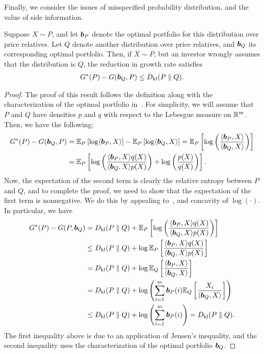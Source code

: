     Finally, we consider the issues of misspecified probability distribution, and the value of side information. 
    \begin{proposition}
        \label{prop:misspecified-distribution-portfolio}
         Suppose $X \sim P$, and let $\boldsymbol{b}_P$ denote the  optimal portfolio for this distribution over price relatives. Let $Q$ denote another distribution over price relatives, and $\boldsymbol{b}_Q$ its corresponding optimal portfolio. Then, if $X\sim P$, but an investor wrongly assumes that the distribution is $Q$, the reduction in growth rate satisfies 
        \begin{align}
            G^*(P) - G(\boldsymbol{b}_Q, P) \leq D_{\text{kl}}(P \parallel Q). 
        \end{align}
    \end{proposition} 
    \begin{proof}
        The proof of this result follows the definition along with the characterization of the optimal portfolio in~.  For simplicity, we will assume that $P$ and $Q$  have densities $p$ and $q$ with respect to the Lebesgue measure on $\mathbb{R}^m$. Then, we have the following: 
        \begin{align}
            G^*(P) - G(\boldsymbol{b}_Q, P) &= \mathbb{E}_P\left[ \log \langle \boldsymbol{b}_P, X \rangle \right]  - \mathbb{E}_P\left[ \log \langle \boldsymbol{b}_Q, X \rangle \right]  
             = \mathbb{E}_P\left[ \log  \left( \frac{\langle \boldsymbol{b}_P, X \rangle}{\langle \boldsymbol{b}_Q, X \rangle} \right)  \right]\\
             & = \mathbb{E}_P \left[ \log  \left( \frac{\langle \boldsymbol{b}_P, X \rangle  q(X)}{\langle \boldsymbol{b}_Q, X \rangle  p(X)} \right)  + \log \left( \frac{p(X)}{q(X)}\right) \right]. 
        \end{align}
        Now, the expectation of the second term is clearly the relative entropy between $P$ and $Q$, and to complete the proof, we need to show that the expectation of the first term is nonnegative. We do this by appealing to~, and concavity of $\log(\cdot)$. In particular, we have 
        \begin{align}
            G^*(P) - G(P, \boldsymbol{b}_Q) &= D_{\text{kl}}(P \parallel Q) + \mathbb{E}_P \left[ \log  \left( \frac{\langle \boldsymbol{b}_P, X \rangle  q(X)}{\langle \boldsymbol{b}_Q, X \rangle  p(X)} \right) \right]  \\
            & \leq D_{\text{kl}}(P \parallel Q) + \log   \mathbb{E}_P \left[ \frac{\langle \boldsymbol{b}_P, X \rangle  q(X)}{\langle \boldsymbol{b}_Q, X \rangle  p(X)}  \right]   \\
            & = D_{\text{kl}}(P \parallel Q) + \log   \mathbb{E}_Q \left[ \frac{\langle \boldsymbol{b}_P, X \rangle }{\langle \boldsymbol{b}_Q, X \rangle}  \right]   \\
            & = D_{\text{kl}}(P \parallel Q) + \log \left( \sum_{i=1}^m \boldsymbol{b}_P(i) \mathbb{E}_Q\left[ \frac{X_i}{\langle \boldsymbol{b}_Q, X\rangle} \right] \right) \\
            & \leq D_{\text{kl}}(P \parallel Q)  + \log \left( \sum_{i=1}^m \boldsymbol{b}_P(i)  \right) = D_{\text{kl}}(P \parallel Q). 
        \end{align}
        The first inequality above is due to an application of Jensen's inequality, and the second inequality uses the characterization of the optimal portfolio $\boldsymbol{b}_Q$. 
    \end{proof}

